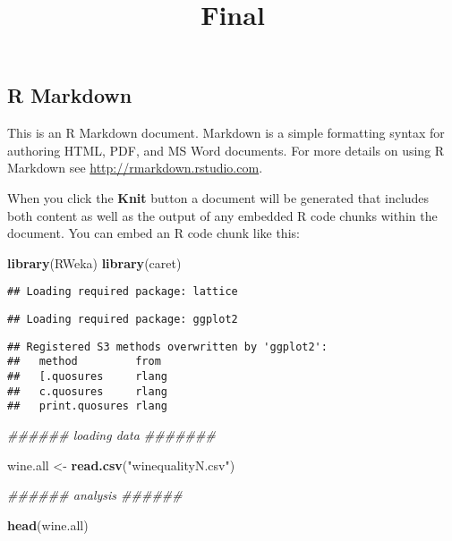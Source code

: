\documentclass[]{article}
\title{Final}
\author{}
\date{}
\newenvironment{Shaded}{\begin{snugshade}}{\end{snugshade}}
\newcommand{\CommentTok}[1]{\textcolor[rgb]{0.56,0.35,0.01}{\textit{#1}}}
\newcommand{\KeywordTok}[1]{\textcolor[rgb]{0.13,0.29,0.53}{\textbf{#1}}}
\newcommand{\NormalTok}[1]{#1}
\newcommand{\StringTok}[1]{\textcolor[rgb]{0.31,0.60,0.02}{#1}}
\begin{document}
\maketitle

\hypertarget{r-markdown}{%
\subsection{R Markdown}\label{r-markdown}}

This is an R Markdown document. Markdown is a simple formatting syntax
for authoring HTML, PDF, and MS Word documents. For more details on
using R Markdown see \url{http://rmarkdown.rstudio.com}.

When you click the \textbf{Knit} button a document will be generated
that includes both content as well as the output of any embedded R code
chunks within the document. You can embed an R code chunk like this:

\begin{Shaded}
\begin{Highlighting}[]
\KeywordTok{library}\NormalTok{(RWeka)}
\KeywordTok{library}\NormalTok{(caret)}
\end{Highlighting}
\end{Shaded}

\begin{verbatim}
## Loading required package: lattice
\end{verbatim}

\begin{verbatim}
## Loading required package: ggplot2
\end{verbatim}

\begin{verbatim}
## Registered S3 methods overwritten by 'ggplot2':
##   method         from 
##   [.quosures     rlang
##   c.quosures     rlang
##   print.quosures rlang
\end{verbatim}

\begin{Shaded}
\begin{Highlighting}[]
\CommentTok{###### loading data #######}

\NormalTok{wine.all <-}\StringTok{ }\KeywordTok{read.csv}\NormalTok{(}\StringTok{"winequalityN.csv"}\NormalTok{)}

\CommentTok{###### analysis ######}

\KeywordTok{head}\NormalTok{(wine.all)}
\end{Highlighting}
\end{Shaded}
\end{document}
